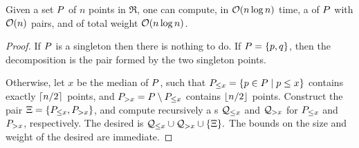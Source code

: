 \documentclass[12pt]{article}%
\begin{document}
\begin{lemma}
    Given a set $P$ of $n$ points in $\Re$, one can compute, in
    $\mathcal{O}( n \log n)$ time, a \QSPD of $P$ with $\mathcal{O}(n)$ pairs, and of
    total weight $\mathcal{O}( n \log n)$.
\end{lemma}
\begin{proof}
    If $P$ is a singleton then there is nothing to do. If
    $P = \{ p, q \}$, then the decomposition is the pair formed
    by the two singleton points.

    Otherwise, let $x$ be the median of $P$, such that
    $P_{\leq x} = \left\{  p \in P  \;\middle\vert\; p \leq x \right\}$ contains exactly
    $\left\lceil {n/2} \right\rceil$ points, and $P_{> x} = P \setminus P_{\leq x}$
    contains $\left\lfloor {n/2} \right\rfloor$ points. Construct the pair
    $\Xi = \{ P_{\leq x}, P_{> x} \}$, and compute recursively a
    \QSPD{}s $\mathcal{Q}_{\leq x}$ and $\mathcal{Q}_{> x}$ for $P_{\leq x}$ and
    $P_{> x}$, respectively. The desired \QSPD is
    \begin{math}
        \mathcal{Q}_{\leq x} \cup \mathcal{Q}_{> x} \cup \{ \Xi \}.
    \end{math}
    The bounds on the size and weight of the desired \QSPD are
    immediate.
\end{proof}
\end{document}
